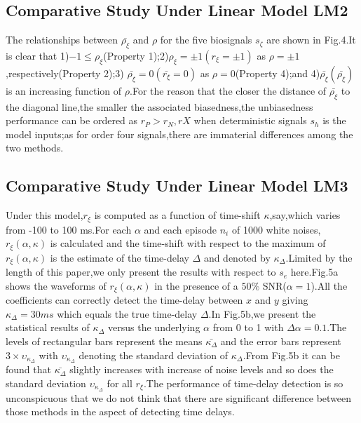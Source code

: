 \documentclass[journal]{IEEEtran}
\begin{document}
  \subsection{Comparative Study Under Linear Model LM2}
  The relationships between $\bar{\rho_{\xi}}$ and $\rho$ for the five biosignals $s_{\zeta}$ are shown in Fig.4.It is clear that 1)$-1\leq \rho_{\xi}$(Property 1);2)$\rho_{\xi}=\pm 1(r_{\xi}=\pm 1)$ as $\rho=\pm 1$,respectively(Property 2);3) $\bar{\rho_{\xi}}=0(\bar{r_{\xi}}=0)$ as $\rho=0$(Property 4);and 4)$\bar{\rho_{\xi}}(\bar{\rho_{\xi}})$ is an increasing function of $\rho$.For the reason that the closer the distance of $\bar{\rho_{\xi}}$ to the diagonal line,the smaller the associated biasedness,the unbiasedness performance can be ordered as $r_{P}>r_{N},r{X}$ when deterministic signals $s_{h}$ is the model inputs;as for order four signals,there are immaterial differences among the two methods.

  \subsection{Comparative Study Under Linear Model LM3}
  Under this model,$r_{\xi}$ is computed as a function of time-shift $\kappa$,say,which varies from -100 to 100 ms.For each $\alpha$ and each episode $n_{i}$ of 1000 white noises,$r_{\xi}(\alpha,\kappa)$ is calculated and the time-shift with respect to the maximum of $r_{\xi}(\alpha,\kappa)$ is the estimate of the time-delay $\Delta$ and denoted by $\kappa_{\Delta}$.Limited by the length of this paper,we only present the results with respect to $s_{e}$ here.Fig.5a shows the waveforms of $r_{\xi}(\alpha,\kappa)$ in the presence of a $50\%$ SNR($\alpha=1$).All the coefficients can correctly detect the time-delay between $x$ and $y$ giving $\kappa_{\Delta}=30ms$ which equals the true time-delay $\Delta$.In Fig.5b,we present the statistical results of $\kappa_{\Delta}$ versus the underlying $\alpha$ from 0 to 1 with $\Delta\alpha=0.1$.The levels of rectangular bars represent the means $\bar{\kappa_{\Delta}}$ and the error bars represent $3\times\upsilon_{\kappa_{\Delta}}$ with $\upsilon_{\kappa_{\Delta}}$ denoting the standard deviation of $\kappa_{\Delta}$.From Fig.5b it can be found that $\bar{\kappa_{\Delta}}$ slightly increases with increase of noise levels and so does the standard deviation $\upsilon_{\kappa_{\Delta}}$ for all $r_{\xi}$.The performance of time-delay detection is so unconspicuous that we do not think that there are significant difference between those methods in the aspect of detecting time delays.
\end{document}
